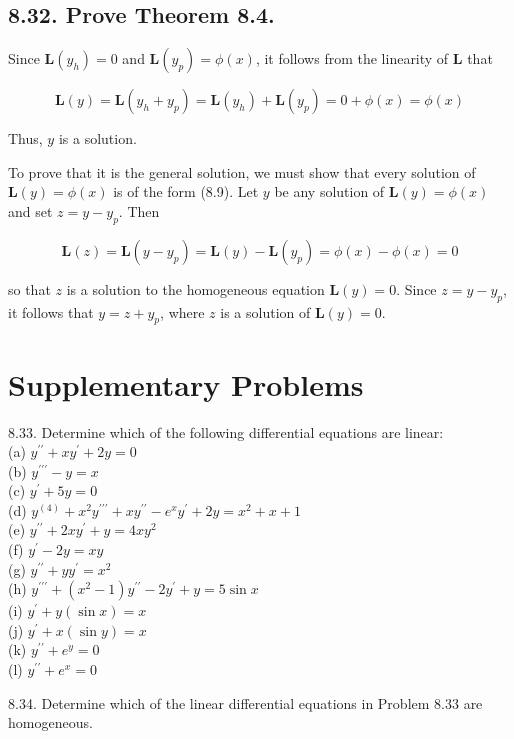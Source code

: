 \documentclass[10pt]{article}
\begin{document}
\subsection*{8.32. Prove Theorem 8.4.}
Since $\mathbf{L}\left(y_{h}\right)=0$ and $\mathbf{L}\left(y_{p}\right)=\phi(x)$, it follows from the linearity of $\mathbf{L}$ that

$$
\mathbf{L}(y)=\mathbf{L}\left(y_{h}+y_{p}\right)=\mathbf{L}\left(y_{h}\right)+\mathbf{L}\left(y_{p}\right)=0+\phi(x)=\phi(x)
$$

Thus, $y$ is a solution.

To prove that it is the general solution, we must show that every solution of $\mathbf{L}(y)=\phi(x)$ is of the form (8.9). Let $y$ be any solution of $\mathbf{L}(y)=\phi(x)$ and set $z=y-y_{p}$. Then

$$
\mathbf{L}(z)=\mathbf{L}\left(y-y_{p}\right)=\mathbf{L}(y)-\mathbf{L}\left(y_{p}\right)=\phi(x)-\phi(x)=0
$$

so that $z$ is a solution to the homogeneous equation $\mathbf{L}(y)=0$. Since $z=y-y_{p}$, it follows that $y=z+y_{p}$, where $z$ is a solution of $\mathbf{L}(y)=0$.

\section*{Supplementary Problems}
8.33. Determine which of the following differential equations are linear:\\
(a) $y^{\prime \prime}+x y^{\prime}+2 y=0$\\
(b) $y^{\prime \prime \prime}-y=x$\\
(c) $y^{\prime}+5 y=0$\\
(d) $y^{(4)}+x^{2} y^{\prime \prime \prime}+x y^{\prime \prime}-e^{x} y^{\prime}+2 y=x^{2}+x+1$\\
(e) $y^{\prime \prime}+2 x y^{\prime}+y=4 x y^{2}$\\
(f) $y^{\prime}-2 y=x y$\\
(g) $y^{\prime \prime}+y y^{\prime}=x^{2}$\\
(h) $y^{\prime \prime \prime}+\left(x^{2}-1\right) y^{\prime \prime}-2 y^{\prime}+y=5 \sin x$\\
(i) $y^{\prime}+y(\sin x)=x$\\
(j) $y^{\prime}+x(\sin y)=x$\\
(k) $y^{\prime \prime}+e^{y}=0$\\
(l) $y^{\prime \prime}+e^{x}=0$

8.34. Determine which of the linear differential equations in Problem 8.33 are homogeneous.
\end{document}
